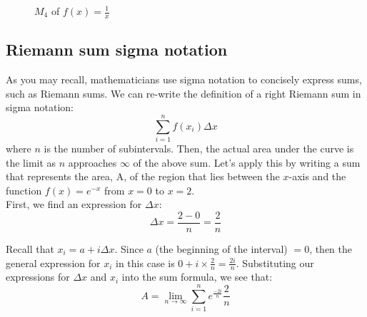 \begin{figure}
    \centering
    \caption{$M_4$ of $f(x)=\frac{1}{x}$}
    \label{fig:midriemann}
\end{figure}

\subsection{Riemann sum sigma notation}
As you may recall, mathematicians use sigma notation to concisely express sums, such as Riemann sums. We can re-write the definition of a right Riemann sum in sigma notation:\\
$$\sum_{i=1}^{n}f(x_{i})\Delta x$$ where $n$ is the number of subintervals. Then, the actual area under the curve is the limit as $n$ approaches $\infty$ of the above sum. Let's apply this by writing a sum that represents the area, A, of the region that lies between the $x$-axis and the function $f(x) = e^{-x}$ from $x=0$ to $x=2$. \\

First, we find an expression for $\Delta x$:\\
$$\Delta x = \frac{2-0}{n}=\frac{2}{n}$$

Recall that $x_i = a+i\Delta x$. Since $a$ (the beginning of the interval) $=0$, then the general expression for $x_i$ in this case is $0+i\times\frac{2}{n}=\frac{2i}{n}$. Substituting our expressions for $\Delta x$ and $x_i$ into the sum formula, we see that:\\
$$A=\lim_{n\to\infty}\sum_{i=1}^{n}e^{\frac{-2i}{n}}\frac{2}{n}$$

